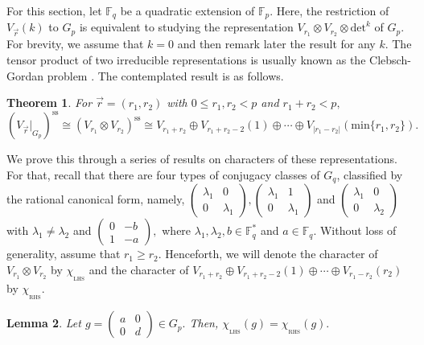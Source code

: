 \documentclass[10pt, reqno]{amsart}
\def\F{{\mathbb F}}
\def\Gq{{G_q}}
\def\Gp{{G_p}}
\def\CL{{\chi_{_{\mathrm{LHS}}}}}
\def\CR{{\chi_{_{\mathrm{RHS}}}}}
\numberwithin{equation}{section}
\newtheorem{theorem}{Theorem}[section] %
\newtheorem{lemma}[theorem]{Lemma}%
\theoremstyle{remark}
\begin{document}
	For this section, let $\F_q$ be a quadratic extension of $\F_p.$ Here, the restriction of $V_{\vec{r}}(k)$ to $\Gp$  is equivalent to studying the representation $V_{r_1}\otimes V_{r_2}\otimes\mathrm{det}^k$ of $\Gp.$ For brevity, we assume that $k=0$ and then remark later the result for any $k.$ The tensor product of two irreducible representations is usually known as the Clebsch-Gordan problem \cite{FH}. The contemplated result is as follows.
	\begin{theorem}\label{T1}
		For $\vec{r}=(r_1,r_2)$ with $0\leq r_1, r_2< p$ and $r_1+r_2<p,$
		\begin{equation}\label{E1}
			\tag{I}
			\left({V_{\vec{r}}|}_{\Gp}\right)^{\mathrm{ss}}\cong\left(V_{r_1}\otimes V_{r_2}\right)^\mathrm{ss}\cong V_{r_1+r_2}\oplus V_{r_1+r_2-2}(1)\oplus\cdots\oplus V_{|r_1-r_2|}(\mathrm{min}\{r_1,r_2\}).
		\end{equation}
	\end{theorem}
	We prove this through a series of results on characters of these representations. For that, recall that there are four types of conjugacy classes of $\Gq$, classified by the rational canonical form, namely, $\left(
			\begin{matrix}
				\lambda_1 & 0\\
				0 & \lambda_1
			\end{matrix}
			\right) , \left(
			\begin{matrix}
				\lambda_1 & 1\\
				0 & \lambda_1
			\end{matrix}
			\right)$ and $\left(
			\begin{matrix}
				\lambda_1 & 0\\
				0 & \lambda_2
			\end{matrix}
			\right)$ with $\lambda_1\neq\lambda_2$ and $\left(
			\begin{matrix}
				0 & -b\\
				1 & -a
			\end{matrix}
			\right),$ where $\lambda_1,\lambda_2,b\in\F_q^*$ and $a\in\F_q$. Without loss of generality, assume that $r_1\geq r_2.$ Henceforth, we will denote the character of $V_{r_1}\otimes V_{r_2}$ by $\CL$ and the character of $V_{r_1+r_2}\oplus V_{r_1+r_2-2}(1)\oplus\cdots\oplus V_{r_1-r_2}(r_2)$ by $\CR.$
	
	\begin{lemma}\label{L1}
		Let $g=\left(
		\begin{matrix}
			a & 0\\
			0 & d
		\end{matrix}
		\right)\in \Gp.$ Then, $\CL(g)=\CR(g).$
	\end{lemma}
	
\end{document}
